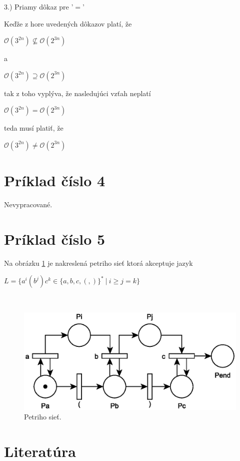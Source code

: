 \documentclass[11pt,a4paper]{article}
\begin{document}
\hspace{5mm}3.) Priamy dôkaz pre '$=$'

\begin{flushright}
\begin{minipage}{0.92\textwidth}
  Keďže z hore uvedených dôkazov platí, že
  \begin{center}
    $\mathcal{O}(3^{2n}) \nsubseteq \mathcal{O}(2^{3n})$
  \end{center}
  a
  \begin{center}
    $\mathcal{O}(3^{2n}) \supseteq \mathcal{O}(2^{3n})$
  \end{center}
  tak z toho vyplýva, že nasledujúci vzťah neplatí
  \begin{center}
    $\mathcal{O}(3^{2n}) = \mathcal{O}(2^{3n})$
  \end{center}
  teda musí platiť, že
  \begin{center}
    $\mathcal{O}(3^{2n}) \neq \mathcal{O}(2^{3n})$
  \end{center}
\end{minipage}
\end{flushright}

\newpage
\section{Príklad číslo 4}

Nevypracované.

\newpage
\section{Príklad číslo 5}

Na obrázku \ref{fig:pn} je nakreslená petriho sieť ktorá akceptuje jazyk

\begin{center}
$L = \{a^i(b^j)c^k \in \{a,b,c,(,)\}^* \ | \ i \geq j = k\}$
\end{center}

\hfill\\[-4em]

\begin{figure}[H]
  \centering
  \includegraphics[scale=1.1]{img/pn.eps}
  \caption{Petriho sieť.}
  \label{fig:pn}
\end{figure}


\newpage
\section{Literatúra}

\begin{flushleft}
    
\end{flushleft}
\end{document}
